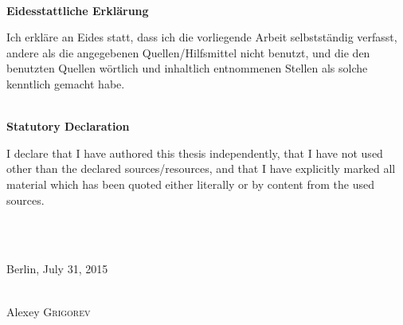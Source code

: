 \restoregeometry

\newpage

\ \\

\textbf{Eidesstattliche Erkl\"arung}

Ich erkl\"are an Eides statt, dass ich die vorliegende Arbeit selbstst\"andig
verfasst, andere als die angegebenen Quellen/Hilfsmittel nicht benutzt,
und die den benutzten Quellen w\"ortlich und inhaltlich entnommenen Stellen
als solche kenntlich gemacht habe.

\ \\

\textbf{Statutory Declaration}

I declare that I have authored this thesis independently, that I have not used
other than the declared sources/resources, and that I have explicitly marked
all material which has been quoted either literally or by content from the used sources.

\ \\ \ \\

\begin{flushright}

Berlin, July 31, 2015

\ \\

Alexey \textsc{Grigorev}

\end{flushright}

\newpage
